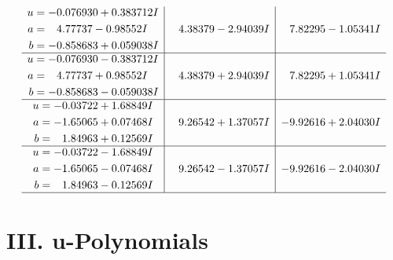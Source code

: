 \documentclass[1p]{elsarticle_modified}
\theoremstyle{definition}
\begin{document}
$$\begin{array}{c|c|c}
\begin{aligned}
u &= -0.076930 + 0.383712 I \\
a &= \phantom{-}4.77737 - 0.98552 I \\
b &= -0.858683 + 0.059038 I\end{aligned}
 & \phantom{-}4.38379 - 2.94039 I & \phantom{-}7.82295 - 1.05341 I \\ \hline\begin{aligned}
u &= -0.076930 - 0.383712 I \\
a &= \phantom{-}4.77737 + 0.98552 I \\
b &= -0.858683 - 0.059038 I\end{aligned}
 & \phantom{-}4.38379 + 2.94039 I & \phantom{-}7.82295 + 1.05341 I \\ \hline\begin{aligned}
u &= -0.03722 + 1.68849 I \\
a &= -1.65065 + 0.07468 I \\
b &= \phantom{-}1.84963 + 0.12569 I\end{aligned}
 & \phantom{-}9.26542 + 1.37057 I & -9.92616 + 2.04030 I \\ \hline\begin{aligned}
u &= -0.03722 - 1.68849 I \\
a &= -1.65065 - 0.07468 I \\
b &= \phantom{-}1.84963 - 0.12569 I\end{aligned}
 & \phantom{-}9.26542 - 1.37057 I & -9.92616 - 2.04030 I\\
 \hline 
 \end{array}$$\newpage
\newpage\renewcommand{\arraystretch}{1}
\centering \section*{ III. u-Polynomials}
\end{document}
